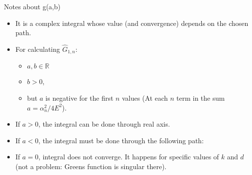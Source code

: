\begin{frame}[allowframebreaks]{Notes about g(a,b)}
  \begin{itemize}
    \item It is a complex integral whose value (and convergence) depends on the chosen path.
    \item For calculating $\hat{G}_{1,n}$:
      \begin{itemize}
        \item $a,b \in \mathbb{R}$
        \item $b>0$, 
        \item but $a$ is negative for the first $n$ values (At each $n$ term in 
          the sum $a=\alpha_n^2/4E^2$).
      \end{itemize}
    \item If $a>0$, the integral can be done through real axis.
    \item If $a<0$, the integral must be done through the following path:

      \vbs


    \item If $a=0$, integral does not converge. It happens for specific values 
      of $k$ and $d$ (not a problem: Greens function is singular there).
  \end{itemize}
\end{frame}


